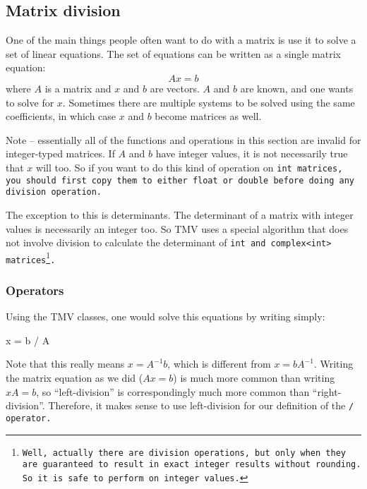 \subsection{Matrix division}
\label{Matrix_Division}

One of the main things people often want to do with a matrix is use it to solve a 
set of linear equations.  The set of equations can be written as a single matrix
equation:
\begin{equation*}
\nonumber
A x = b
\end{equation*}
where $A$ is a matrix and $x$ and $b$ are vectors.  $A$ and $b$ are known, 
and one wants to solve for $x$.  Sometimes there are
multiple systems to be solved using the same coefficients, in which case
$x$ and $b$ become matrices as well.

Note -- essentially all of the functions and operations in this section are invalid for
integer-typed matrices.  If $A$ and $b$ have integer values, it is not necessarily
true that $x$ will too.  So if you want to do this kind of operation on \tt{int} matrices,
you should first copy them to either \tt{float} or \tt{double} before doing any division
operation.  

The exception to this is determinants.  The determinant of a matrix with integer values
is necessarily an integer too.  So TMV uses a special algorithm that does not involve
division to calculate the determinant of \tt{int} and \tt{complex<int>} matrices\footnote{
Well, actually there are division operations, but only when they are guaranteed to 
result in exact integer results without rounding.  So it is safe to perform on integer values.}.

\subsubsection{Operators}
\label{Matrix_Division_Operators}

Using the TMV classes, one would solve this equations by writing simply:
\begin{tmvcode}
x = b / A
\end{tmvcode}
Note that this really means $x = A^{-1} b$, which is different from $x = b A^{-1}$.
Writing the matrix equation as we did ($A x=b$) is much more common than 
writing $xA=b$, so ``left-division'' is correspondingly much more common than 
``right-division''.  Therefore, it makes sense to use left-division for our definition of the \tt{/}
operator.

